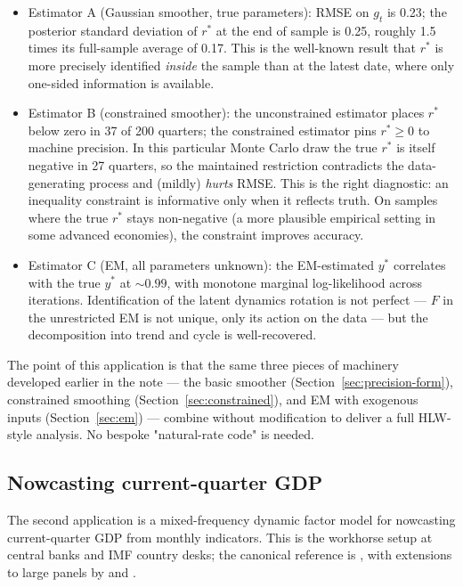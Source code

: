 \documentclass[11pt]{article}
\begin{document}
\begin{itemize}[leftmargin=2em]
\item Estimator A (Gaussian smoother, true parameters):
  RMSE on $g_t$ is 0.23; the posterior standard deviation of $r^*$
  at the end of sample is 0.25, roughly 1.5 times its full-sample
  average of 0.17.  This is the well-known result that $r^*$ is more
  precisely identified \emph{inside} the sample than at the latest
  date, where only one-sided information is available.
\item Estimator B (constrained smoother): the unconstrained
  estimator places $r^*$ below zero in 37 of 200 quarters; the
  constrained estimator pins $r^*\ge 0$ to machine precision.
  In this particular Monte Carlo draw the true $r^*$ is itself
  negative in 27 quarters, so the maintained restriction contradicts
  the data-generating process and (mildly) \emph{hurts} RMSE.  This is
  the right diagnostic: an inequality constraint is informative only
  when it reflects truth.  On samples where the true $r^*$ stays
  non-negative (a more plausible empirical setting in some advanced
  economies), the constraint improves accuracy.
\item Estimator C (EM, all parameters unknown):  the EM-estimated $y^*$
  correlates with the true $y^*$ at $\sim 0.99$, with monotone
  marginal log-likelihood across iterations.  Identification of the
  latent dynamics rotation is not perfect --- $F$ in the unrestricted
  EM is not unique, only its action on the data --- but the
  decomposition into trend and cycle is well-recovered.
\end{itemize}

The point of this application is that the same three pieces of
machinery developed earlier in the note --- the basic smoother
(Section~\ref{sec:precision-form}), constrained smoothing
(Section~\ref{sec:constrained}), and EM with exogenous inputs
(Section~\ref{sec:em}) --- combine without modification to deliver a
full HLW-style analysis.  No bespoke "natural-rate code" is needed.

\subsection{Nowcasting current-quarter GDP}
\label{sec:apps-nowcast}

The second application is a mixed-frequency dynamic factor model for
nowcasting current-quarter GDP from monthly indicators.  This is the
workhorse setup at central banks and IMF country desks; the canonical
reference is \citet{MarianoMurasawa2003}, with extensions to large
panels by \citet{GiannoneReichlinSmall2008} and
\citet{BanburaModugno2014}.
\end{document}
